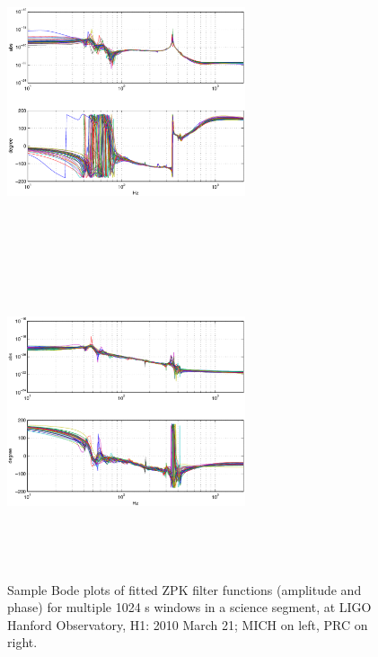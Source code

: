 \begin{figure}
\begin{center}
\includegraphics[height=90mm, width=70mm]{figure4a.eps}
\includegraphics[height=90mm, width=70mm]{figure4b.eps}
\caption{Sample Bode plots of fitted ZPK filter functions (amplitude and phase) for multiple 1024 s windows in a science segment, at LIGO Hanford Observatory, H1: 2010 March 21; MICH on left, PRC on right.}
\label{BodePlots}
\end{center}
\end{figure}
